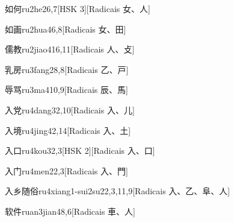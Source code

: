 \begin{entry}{如何}{ru2he2}{6,7}[HSK 3][Radicais ⼥、⼈]
\end{entry}

\begin{entry}{如画}{ru2hua4}{6,8}[Radicais ⼥、⽥]
\end{entry}

\begin{entry}{儒教}{ru2jiao4}{16,11}[Radicais ⼈、⽁]
\end{entry}

\begin{entry}{乳房}{ru3fang2}{8,8}[Radicais ⼄、⼾]
\end{entry}

\begin{entry}{辱骂}{ru3ma4}{10,9}[Radicais ⾠、⾺]
\end{entry}

\begin{entry}{入党}{ru4dang3}{2,10}[Radicais ⼊、⼉]
\end{entry}

\begin{entry}{入境}{ru4jing4}{2,14}[Radicais ⼊、⼟]
\end{entry}

\begin{entry}{入口}{ru4kou3}{2,3}[HSK 2][Radicais ⼊、⼝]
\end{entry}

\begin{entry}{入门}{ru4men2}{2,3}[Radicais ⼊、⾨]
\end{entry}

\begin{entry}{入乡随俗}{ru4xiang1-sui2su2}{2,3,11,9}[Radicais ⼊、⼄、⾩、⼈]
\end{entry}

\begin{entry}{软件}{ruan3jian4}{8,6}[Radicais ⾞、⼈]
\end{entry}


